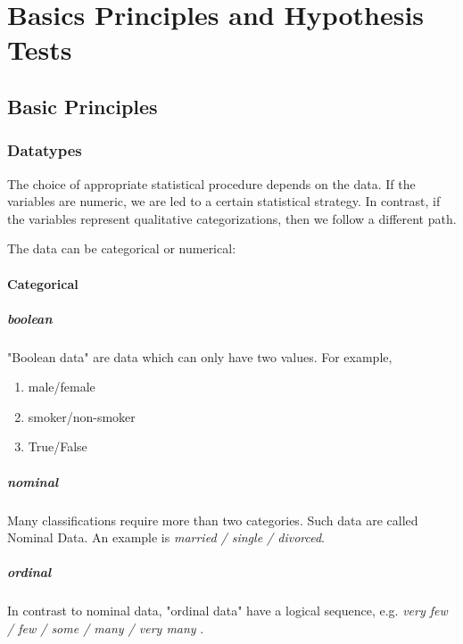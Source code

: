 \part{Basics Principles and Hypothesis Tests}

\chapter{Basic Principles}

\section{Datatypes}

The choice of appropriate statistical procedure depends on the data. If the variables are numeric, we are led to a certain statistical strategy. In contrast, if the variables represent qualitative categorizations, then we follow a different path.

 The data can be \gls{categorical} or \gls{numerical}:

\subsection{Categorical} 

\subsubsection{boolean}

"Boolean data" are data which can only have two values. For example,
\begin{enumerate}
  \item male/female
  \item smoker/non-smoker
  \item True/False
\end{enumerate}

\subsubsection{nominal}
Many classifications require more than two categories. Such data are called Nominal Data. An example is  \emph{married / single / divorced}.

\subsubsection{ordinal}
In contrast to nominal data, "ordinal data" have a logical sequence, e.g. \emph{very few / few / some / many / very many} .

